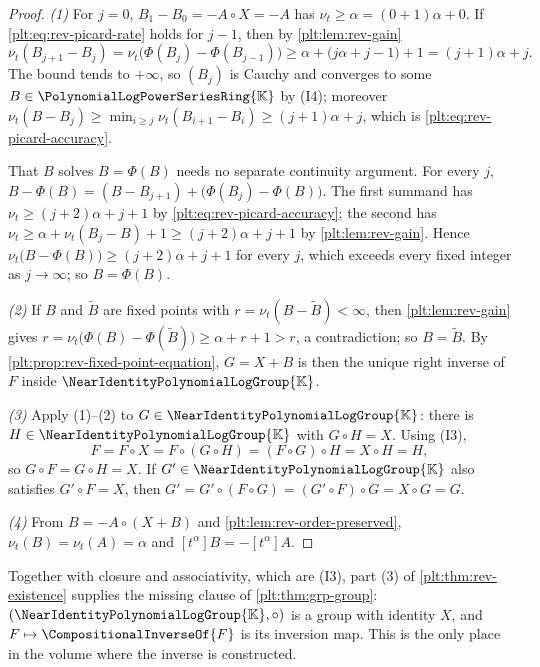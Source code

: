 \documentclass[11pt,oneside]{article}
\theoremstyle{plain}
\theoremstyle{definition}
\theoremstyle{remark}
\newcommand{\K}{\mathbb{K}}
\newcommand{\PLpow}{\PolynomialLogPowerSeriesRing{\K}}   %
\newcommand{\Gnear}{\NearIdentityPolynomialLogGroup{\K}} %
\newcommand{\ordt}{\nu_{t}}                              %
\newcommand{\compose}{\mathbin{\circ}}
\newcommand{\rev}[1]{\CompositionalInverseOf{#1}}
\begin{document}
\begin{proof}
\emph{(1)}  For \(j=0\), \(B_1-B_0=-A\compose X=-A\) has \(\ordt\ge\alpha
=(0+1)\alpha+0\).  If \eqref{plt:eq:rev-picard-rate} holds for \(j-1\), then by
\cref{plt:lem:rev-gain}
\[
 \ordt(B_{j+1}-B_j)=\ordt\bigl(\Phi(B_j)-\Phi(B_{j-1})\bigr)
 \ge\alpha+\bigl(j\alpha+j-1\bigr)+1=(j+1)\alpha+j .
\]
The bound tends to \(+\infty\), so \((B_j)\) is Cauchy and converges to some
\(B\in\PLpow\) by (I4); moreover
\(\ordt(B-B_j)\ge\min_{i\ge j}\ordt(B_{i+1}-B_i)\ge(j+1)\alpha+j\), which is
\eqref{plt:eq:rev-picard-accuracy}.

That \(B\) solves \(B=\Phi(B)\) needs no separate continuity argument.  For
every \(j\), \(B-\Phi(B)=(B-B_{j+1})+\bigl(\Phi(B_j)-\Phi(B)\bigr)\).  The
first summand has \(\ordt\ge(j+2)\alpha+j+1\) by
\eqref{plt:eq:rev-picard-accuracy}; the second has
\(\ordt\ge\alpha+\ordt(B_j-B)+1\ge(j+2)\alpha+j+1\) by
\cref{plt:lem:rev-gain}.  Hence
\(\ordt\bigl(B-\Phi(B)\bigr)\ge(j+2)\alpha+j+1\) for every \(j\), which
exceeds every fixed integer as \(j\to\infty\); so \(B=\Phi(B)\).

\emph{(2)}  If \(B\) and \(\widetilde B\) are fixed points with
\(r=\ordt(B-\widetilde B)<\infty\), then \cref{plt:lem:rev-gain} gives
\(r=\ordt\bigl(\Phi(B)-\Phi(\widetilde B)\bigr)\ge\alpha+r+1>r\), a
contradiction; so \(B=\widetilde B\).  By
\cref{plt:prop:rev-fixed-point-equation}, \(G=X+B\) is then the unique right
inverse of \(F\) inside \(\Gnear\).

\emph{(3)}  Apply (1)--(2) to \(G\in\Gnear\): there is \(H\in\Gnear\) with
\(G\compose H=X\).  Using (I3),
\[
 F=F\compose X=F\compose(G\compose H)=(F\compose G)\compose H=X\compose H=H,
\]
so \(G\compose F=G\compose H=X\).  If \(G'\in\Gnear\) also satisfies
\(G'\compose F=X\), then
\(G'=G'\compose(F\compose G)=(G'\compose F)\compose G=X\compose G=G\).

\emph{(4)}  From \(B=-A\compose(X+B)\) and \cref{plt:lem:rev-order-preserved},
\(\ordt(B)=\ordt(A)=\alpha\) and \([t^\alpha]B=-[t^\alpha]A\).
\end{proof}

Together with closure and associativity, which are (I3), part (3) of
\cref{plt:thm:rev-existence} supplies the missing clause of
\cref{plt:thm:grp-group}: \((\Gnear,\compose)\) is a group with identity
\(X\), and \(F\mapsto\rev{F}\) is its inversion map.  This is the only place in
the volume where the inverse is constructed.
\end{document}

